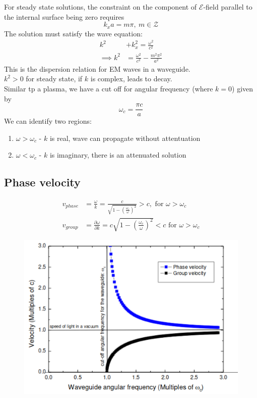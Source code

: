 \documentclass[a4paper, 11pt, normalem]{report}
\newcommand\p{\partial}
\newcommand\E{\mathcal{E}}
\newcommand\om{\omega}
\begin{document}
For steady state solutions, the constraint on the component of $\E$-field parallel to the internal surface being zero requires
\begin{equation}
	k_xa = m\pi,~ m \in \mathcal{Z}
\end{equation}
The solution must satisfy the wave equation:
\begin{align}
	k^2 &+ k_x^2 = \frac{\om^2}{c^2} \\
	\implies k^2 &= \frac{\om^2}{c^2} - \frac{m^2\pi^2}{a^2}
\end{align}
This is the dispersion relation for EM waves in a waveguide. \\
$k^2 > 0$ for steady state, if $k$ is complex, leads to decay. \\
Similar tp a plasma, we have a cut off for angular frequency (where $k = 0$) given by
\begin{equation}
	\om_c = \frac{\pi c}{a}
\end{equation}
We can identify two regions:
\begin{enumerate}
	\item $\om > \om_c$ - $k$ is real, wave can propagate without attentuation
	\item $\om < \om_c$ - $k$ is imaginary, there is an attenuated solution
\end{enumerate}

\subsection{Phase velocity}
\begin{align}
	v_{phase} &= \frac{\om}{k} = \frac{c}{\sqrt{1 - \left(\frac{\om_c}{\om}\right)^2}} > c, \text{ for } \om > \om_c \\
	v_{group} &= \frac{\p \om}{\p k} = c\sqrt{1 - \left(\frac{\om_c}{\om}\right)^2} < c \text{ for } \om > \om_c
\end{align}

\begin{figure}[H]
	\centering
	\includegraphics[scale=0.5]{phasegroup2.png}
\end{figure}
\end{document}
